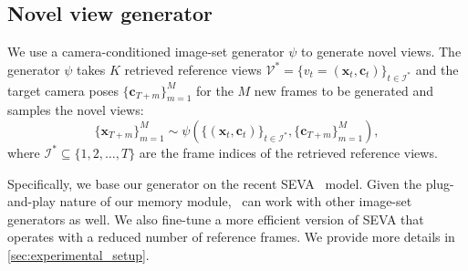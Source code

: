 \subsection{Novel view generator}%
\label{sec:generator}



We use a camera-conditioned image-set generator $\psi$ to generate novel views.
The generator $\psi$ takes $K$ retrieved reference views $\mathcal{V}^* = \{v_t=(\mathbf{x}_t, \mathbf{c}_t)\}_{t \in \mathcal{I}^*}$ and the target camera poses $\{\mathbf{c}_{T+m}\}_{m=1}^M$ for the $M$ new frames to be generated and samples the novel views:
\[
\{\mathbf{x}_{T+m}\}_{m=1}^M \sim \psi\left( \{(\mathbf{x}_t, \mathbf{c}_t)\}_{t \in \mathcal{I}^*}, \{\mathbf{c}_{T+m}\}_{m=1}^M \right),
\]
where $\mathcal{I}^* \subseteq \{1, 2, \ldots, T\}$ are the frame indices of the retrieved reference views.

Specifically, we base our generator on the recent SEVA~\cite{seva} model.
Given the plug-and-play nature of our memory module, \mname~can work with other image-set generators as well.
We also fine-tune a more efficient version of SEVA that operates with a reduced number of reference frames.
We provide more details in \cref{sec:experimental_setup}.
